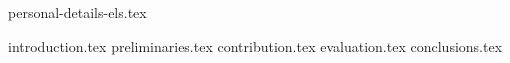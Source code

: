 



	{personal-details-els.tex}

	{introduction.tex}
	{preliminaries.tex}
	{contribution.tex}
	{evaluation.tex}
	{conclusions.tex}

	
	
